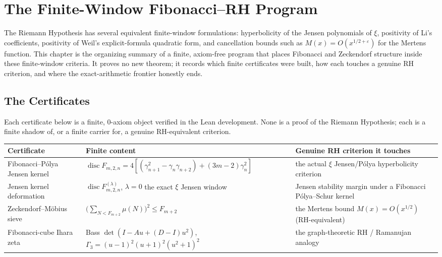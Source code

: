 \chapter{The Finite-Window Fibonacci--RH Program}
\label{ch:concrete-instances-finite-window-fib-rh-program-hub}

The Riemann Hypothesis has several equivalent finite-window formulations: hyperbolicity of the Jensen polynomials of $\xi$, positivity of Li's coefficients, positivity of Weil's explicit-formula quadratic form, and cancellation bounds such as $M(x)=O(x^{1/2+\varepsilon})$ for the Mertens function. This chapter is the organizing summary of a finite, axiom-free program that places Fibonacci and Zeckendorf structure inside these finite-window criteria. It proves no new theorem; it records which finite certificates were built, how each touches a genuine RH criterion, and where the exact-arithmetic frontier honestly ends.

\section{The Certificates}
\label{sec:fib-rh-program-certificates}

Each certificate below is a finite, $0$-axiom object verified in the Lean development. None is a proof of the Riemann Hypothesis; each is a finite shadow of, or a finite carrier for, a genuine RH-equivalent criterion.

\begin{center}
\begin{tabular}{@{}lll@{}}
\textbf{Certificate} & \textbf{Finite content} & \textbf{Genuine RH criterion it touches}\\
\hline
Fibonacci--P\'olya Jensen kernel & $\operatorname{disc}F_{m,2,n}=4[(\gamma_{n+1}^2-\gamma_n\gamma_{n+2})+(3m-2)\gamma_n^2]$ & the actual $\xi$ Jensen/P\'olya hyperbolicity criterion\\
Jensen kernel deformation & $\operatorname{disc}F^{(\lambda)}_{m,2,n}$, $\lambda=0$ the exact $\xi$ Jensen window & Jensen stability margin under a Fibonacci P\'olya--Schur kernel\\
Zeckendorf--M\"obius sieve & $\bigl(\sum_{N<F_{m+2}}\mu(N)\bigr)^2\le F_{m+2}$ & the Mertens bound $M(x)=O(x^{1/2})$ (RH-equivalent)\\
Fibonacci-cube Ihara zeta & Bass $\det(I-Au+(D-I)u^2)$, $\Gamma_3=(u-1)^2(u+1)^2(u^2+1)^2$ & the graph-theoretic RH / Ramanujan analogy\\
\end{tabular}
\end{center}

